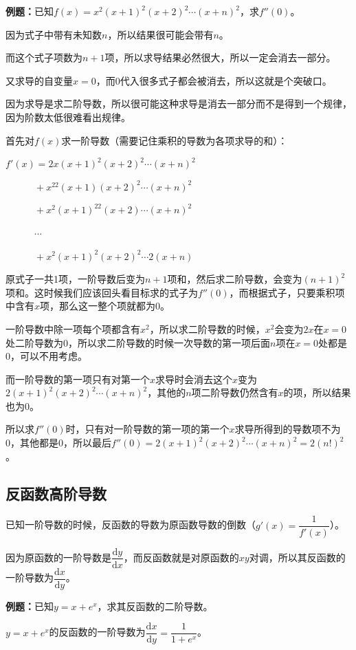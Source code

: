 \textbf{例题：}已知$f(x)=x^2(x+1)^2(x+2)^2\cdots(x+n)^2$，求$f''(0)$。

因为式子中带有未知数$n$，所以结果很可能会带有$n$。

而这个式子项数为$n+1$项，所以求导结果必然很大，所以一定会消去一部分。

又求导的自变量$x=0$，而0代入很多式子都会被消去，所以这就是个突破口。

因为求导是求二阶导数，所以很可能这种求导是消去一部分而不是得到一个规律，因为阶数太低很难看出规律。

首先对$f(x)$求一阶导数（需要记住乘积的导数为各项求导的和）：

$f'(x)=2x(x+1)^2(x+2)^2\cdots(x+n)^2$

$\quad\quad\quad+x^22(x+1)(x+2)^2\cdots(x+n)^2$

$\quad\quad\quad+x^2(x+1)^22(x+2)\cdots(x+n)^2$

$\quad\quad\quad\cdots$

$\quad\quad\quad+x^2(x+1)^2(x+2)^2\cdots 2(x+n)$

原式子一共1项，一阶导数后变为$n+1$项和，然后求二阶导数，会变为$(n+1)^2$项和。这时候我们应该回头看目标求的式子为$f''(0)$，而根据式子，只要乘积项中含有$x$项，那么这一整个项就都为0。

一阶导数中除一项每个项都含有$x^2$，所以求二阶导数的时候，$x^2$会变为$2x$在$x=0$处二阶导数为0，所以求二阶导数的时候一次导数的第一项后面$n$项在$x=0$处都是0，可以不用考虑。

而一阶导数的第一项只有对第一个$x$求导时会消去这个$x$变为$2(x+1)^2(x+2)^2\cdots(x+n)^2$，其他的$n$项二阶导数仍然含有$x$的项，所以结果也为0。

所以求$f''(0)$时，只有对一阶导数的第一项的第一个$x$求导所得到的导数项不为0，其他都是0，所以最后$f''(0)=2(x+1)^2(x+2)^2\cdots(x+n)^2=2(n!)^2$。

\subsection{反函数高阶导数}

已知一阶导数的时候，反函数的导数为原函数导数的倒数（$g'(x)=\dfrac{1}{f'(x)}$）。

因为原函数的一阶导数是$\dfrac{\textrm{d}y}{\textrm{d}x}$，而反函数就是对原函数的$xy$对调，所以其反函数的一阶导数为$\dfrac{\textrm{d}x}{\textrm{d}y}$。

\textbf{例题：}已知$y=x+e^x$，求其反函数的二阶导数。

$y=x+e^x$的反函数的一阶导数为$\dfrac{\textrm{d}x}{\textrm{d}y}=\dfrac{1}{1+e^x}$。

